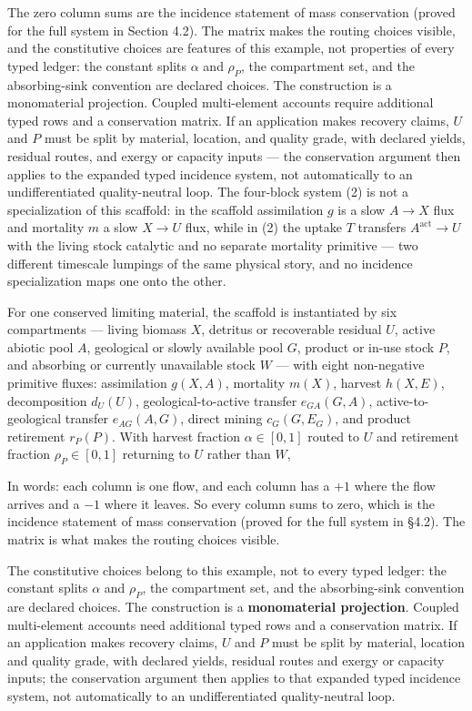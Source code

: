 \documentclass[11pt]{article}
\begin{document}
 The zero column sums are the incidence statement of mass conservation (proved for the full system in Section 4.2). The matrix makes the routing choices visible, and the constitutive choices are features of this example, not properties of every typed ledger: the constant splits \(\alpha\) and \(\rho_P\), the compartment set, and the absorbing-sink convention are declared choices. The construction is a monomaterial projection. Coupled multi-element accounts require additional typed rows and a conservation matrix. If an application makes recovery claims, \(U\) and \(P\) must be split by material, location, and quality grade, with declared yields, residual routes, and exergy or capacity inputs --- the conservation argument then applies to the expanded typed incidence system, not automatically to an undifferentiated quality-neutral loop. The four-block system (2) is not a specialization of this scaffold: in the scaffold assimilation \(g\) is a slow \(A \to X\) flux and mortality \(m\) a slow \(X \to U\) flux, while in (2) the uptake \(T\) transfers \(A^{\mathrm{act}} \to U\) with the living stock catalytic and no separate mortality primitive --- two different timescale lumpings of the same physical story, and no incidence specialization maps one onto the other.

For one conserved limiting material, the scaffold is instantiated by six compartments --- living biomass \(X\), detritus or recoverable residual \(U\), active abiotic pool \(A\), geological or slowly available pool \(G\), product or in-use stock \(P\), and absorbing or currently unavailable stock \(W\) --- with eight non-negative primitive fluxes: assimilation \(g(X,A)\), mortality \(m(X)\), harvest \(h(X,E)\), decomposition \(d_U(U)\), geological-to-active transfer \(e_{GA}(G,A)\), active-to-geological transfer \(e_{AG}(A,G)\), direct mining \(c_G(G,E_G)\), and product retirement \(r_P(P)\). With harvest fraction \(\alpha\in[0,1]\) routed to \(U\) and retirement fraction \(\rho_P\in[0,1]\) returning to \(U\) rather than \(W\),

In words: each column is one flow, and each column has a \(+1\) where the flow arrives and a \(-1\) where it leaves. So every column sums to zero, which is the incidence statement of mass conservation (proved for the full system in \S4.2). The matrix is what makes the routing choices visible.

The constitutive choices belong to this example, not to every typed ledger: the constant splits \(\alpha\) and \(\rho_P\), the compartment set, and the absorbing-sink convention are declared choices. The construction is a \textbf{monomaterial projection}. Coupled multi-element accounts need additional typed rows and a conservation matrix. If an application makes recovery claims, \(U\) and \(P\) must be split by material, location and quality grade, with declared yields, residual routes and exergy or capacity inputs; the conservation argument then applies to that expanded typed incidence system, not automatically to an undifferentiated quality-neutral loop.
\end{document}
